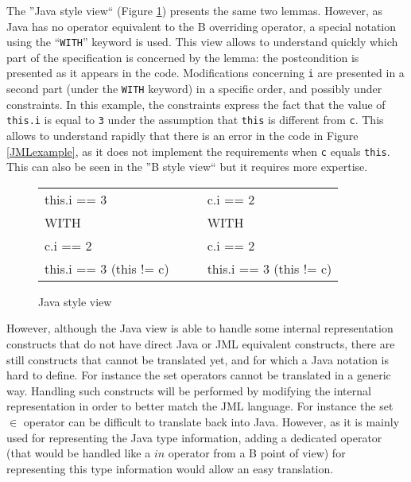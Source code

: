  The ''Java style view`` (Figure \ref{Java style view}) presents the
 same two lemmas. However, as Java has no operator equivalent to the
 B overriding operator, a special notation using the
 ``\texttt{WITH}'' keyword is used. This view allows to understand
 quickly which part of the specification is concerned by the lemma:
 the postcondition is presented as it appears in the
 code. Modifications concerning \texttt{i} are presented in a second
 part (under the \texttt{WITH} keyword) in a specific order, and
 possibly under constraints. In this example, the constraints express
 the fact that the value of \texttt{this.i} is equal to \texttt{3}
 under the assumption that \texttt{this} is different from \texttt{c}.
 This allows to understand rapidly that there is an error in the code
 in Figure \ref{JMLexample}, as it does not implement the
 requirements when \texttt{c} equals \texttt{this}. This can also be
 seen in the ''B style view`` but it requires more expertise.
\begin{figure}[ht]
\begin{center}
 \begin{tabular}{ll|ll}
 this.i == 3 & \hspace{2mm} & \hspace{3mm} & c.i == 2 \\
 WITH & &       &  WITH       \\
 c.i == 2 & &   &  c.i == 2     \\
 this.i == 3 (this != c) & & & this.i == 3 (this != c)
 \end{tabular}
 \caption{Java style view}
 \label{Java style view}
\end{center}
\end{figure}

 However, although the Java view is able to handle some internal
 representation constructs that do not have direct Java or JML
 equivalent constructs, there are still constructs that cannot be
 translated yet, and for which a Java notation is hard to define. For
 instance the set operators cannot be translated in a generic way.
 Handling such constructs will be performed by modifying the internal
 representation in order to better match the JML language. For
 instance the set $\in$ operator can be difficult to translate back
 into Java. However, as it is mainly used for representing the Java
 type information, adding a dedicated operator (that would be handled
 like a $in$ operator from a B point of view) for
 representing this type information would allow an easy translation.

